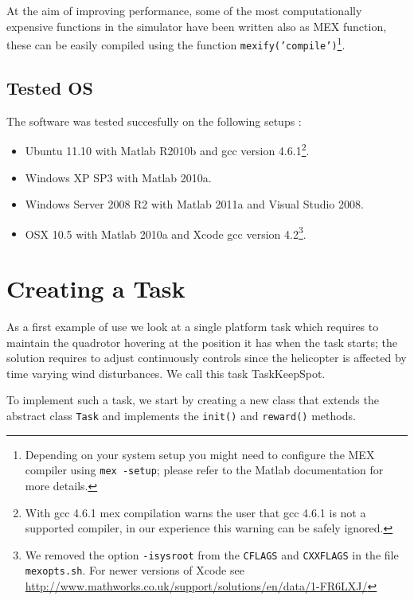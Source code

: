 \documentclass[a4paper,11pt]{report}
\begin{document}
At the aim of improving performance, some of the most computationally expensive functions in the simulator have been written also as MEX function, these can be easily compiled using the function \texttt{mexify('compile')}\footnote{Depending on your system setup you might need to configure the MEX compiler using \texttt{mex -setup}; please refer to the Matlab documentation for more details.}.

\subsection{Tested OS} \label{sec:testedos}

The software was tested succesfully on the following setups :
\begin{itemize}
 \item Ubuntu 11.10 with Matlab R2010b and gcc version 4.6.1\footnote{With gcc 4.6.1 mex compilation warns the user that gcc 4.6.1 is not a supported compiler, in our experience this warning can be safely ignored.}.
 \item Windows XP SP3 with Matlab 2010a.
 \item Windows Server 2008 R2 with Matlab 2011a and Visual Studio 2008.
 \item OSX 10.5 with Matlab 2010a and Xcode gcc version 4.2\footnote{We removed the option \texttt{-isysroot} from the \texttt{CFLAGS} and \texttt{CXXFLAGS} in the file \texttt{mexopts.sh}. For newer versions of Xcode see \url{http://www.mathworks.co.uk/support/solutions/en/data/1-FR6LXJ/}}.
\end{itemize}

\section{Creating a Task}  \label{sec:createtask}

As a first example of use we look at a single platform task which requires to maintain the quadrotor hovering at the position it has when the task starts; the solution requires to adjust continuously controls since the helicopter is affected by time varying wind disturbances. We call this task TaskKeepSpot. 
 
To implement such a task, we start by creating a new class that extends the abstract class \texttt{Task} and implements the \texttt{init()} and \texttt{reward()} methods.
\end{document}

